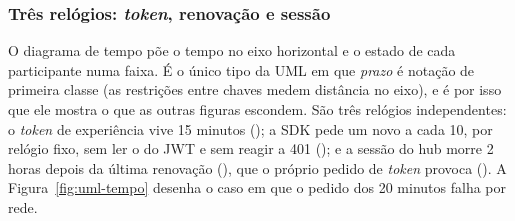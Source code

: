 \subsubsection{Três relógios: \emph{token}, renovação e sessão}

O diagrama de tempo põe o tempo no eixo horizontal e o estado de cada participante
numa faixa. É o único tipo da UML em que \emph{prazo} é notação de primeira classe
(as restrições entre chaves medem distância no eixo), e é por isso que ele mostra o
que as outras figuras escondem. São três relógios independentes: o \emph{token} de
experiência vive 15 minutos (); a SDK pede um novo a
cada 10, por relógio fixo, sem ler o  do JWT e sem reagir a 401
(); e a sessão do hub morre 2 horas depois da última
renovação (), que o próprio pedido de \emph{token} provoca
(). A Figura~\ref{fig:uml-tempo} desenha o caso em que o pedido dos
20 minutos falha por rede.


